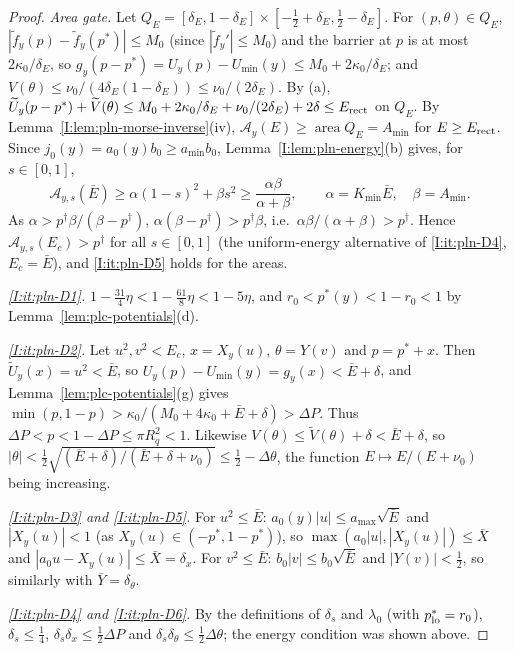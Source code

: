 \begin{proof}
\emph{Area gate.} Let $Q_E=[\delta_E,1-\delta_E]\times[-\frac12+\delta_E,\frac12-\delta_E]$. For $(p,\theta)\in Q_E$,
$|\tilde f_y(p)-\tilde f_y(p^*)|\le M_0$ (since $|\tilde f_y'|\le M_0$) and the barrier at $p$ is at most $2\kappa_0/\delta_E$,
so $g_y(p-p^*)=U_y(p)-U_{\min}(y)\le M_0+2\kappa_0/\delta_E$; and $V(\theta)\le\nu_0/(4\delta_E(1-\delta_E))\le
\nu_0/(2\delta_E)$. By (a), $\widetilde U_y(p-p^*)+\widetilde V(\theta)\le M_0+2\kappa_0/\delta_E+\nu_0/(2\delta_E)+2\delta
\le E_{\rm rect}$ on $Q_E$. By Lemma~\ref{I:lem:pln-morse-inverse}(iv), $\mathcal A_y(E)\ge\operatorname{area}Q_E=A_{\min}$ for
$E\ge E_{\rm rect}$. Since $j_0(y)=a_0(y)b_0\ge a_{\min}b_0$, Lemma~\ref{I:lem:pln-energy}(b) gives, for $s\in[0,1]$,
\[
 \mathcal A_{y,s}(\bar E)\ge\alpha(1-s)^2+\beta s^2\ge\frac{\alpha\beta}{\alpha+\beta},\qquad
 \alpha=K_{\min}\bar E,\quad\beta=A_{\min}.
\]
As $\alpha>p^\dagger\beta/(\beta-p^\dagger)$, $\alpha(\beta-p^\dagger)>p^\dagger\beta$, i.e.\ $\alpha\beta/(\alpha+\beta)>p^\dagger$. Hence
$\mathcal A_{y,s}(E_c)>p^\dagger$ for all $s\in[0,1]$ (the uniform-energy alternative of \ref{I:it:pln-D4}, $E_c=\bar E$), and
\ref{I:it:pln-D5} holds for the areas.

\emph{\ref{I:it:pln-D1}.} $1-\frac{31}4\eta<1-\frac{61}8\eta<1-5\eta$, and $r_0<p^*(y)<1-r_0<1$ by
Lemma~\ref{lem:plc-potentials}(d).

\emph{\ref{I:it:pln-D2}.} Let $u^2,v^2<E_c$, $x=X_y(u)$, $\theta=Y(v)$ and $p=p^*+x$. Then $\widetilde U_y(x)=u^2<\bar E$, so
$U_y(p)-U_{\min}(y)=g_y(x)<\bar E+\delta$, and Lemma~\ref{lem:plc-potentials}(g) gives
$\min(p,1-p)>\kappa_0/(M_0+4\kappa_0+\bar E+\delta)>\Delta P$. Thus $\Delta P<p<1-\Delta P\le\pi R_q^2<1$. Likewise
$V(\theta)\le\widetilde V(\theta)+\delta<\bar E+\delta$, so $|\theta|<\frac12\sqrt{(\bar E+\delta)/(\bar E+\delta+\nu_0)}
\le\frac12-\Delta\theta$, the function $E\mapsto E/(E+\nu_0)$ being increasing.

\emph{\ref{I:it:pln-D3} and \ref{I:it:pln-D5}.} For $u^2\le\bar E$: $a_0(y)|u|\le a_{\max}\sqrt{\bar E}$ and $|X_y(u)|<1$ (as
$X_y(u)\in(-p^*,1-p^*)$), so $\max(a_0|u|,|X_y(u)|)\le\bar X$ and $|a_0u-X_y(u)|\le\bar X=\delta_x$. For $v^2\le\bar E$:
$b_0|v|\le b_0\sqrt{\bar E}$ and $|Y(v)|<\frac12$, so similarly with $\bar Y=\delta_\theta$.

\emph{\ref{I:it:pln-D4} and \ref{I:it:pln-D6}.} By the definitions of $\delta_s$ and $\lambda_0$ (with $p^*_{\rm lo}=r_0$),
$\delta_s\le\frac14$, $\delta_s\delta_x\le\frac12\Delta P$ and $\delta_s\delta_\theta\le\frac12\Delta\theta$; the energy condition was shown above.


\end{proof}
